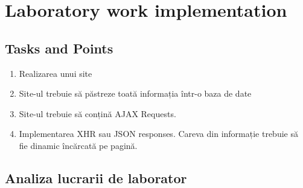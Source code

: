 \section{Laboratory work implementation}

\subsection{Tasks and Points}

\begin{enumerate}
\item Realizarea unui site
\item Site-ul trebuie să păstreze toată informația într-o baza de date
\item Site-ul trebuie să conțină AJAX Requests.
\item Implementarea XHR sau JSON responses. Careva din informație trebuie să fie dinamic încărcată pe pagină.
\end{enumerate}

\subsection{Analiza lucrarii de laborator}

